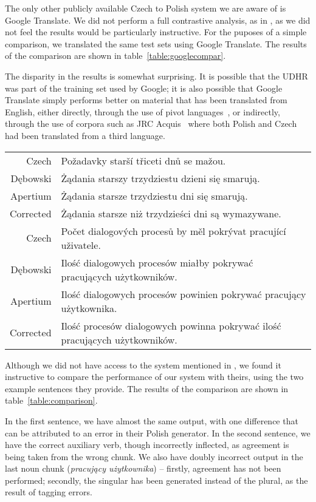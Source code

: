 \documentclass[11pt]{article}
\begin{document}
The only other publicly available Czech to Polish system we are aware of is Google Translate. We did not
perform a full contrastive analysis, as in \cite{tyers2009rfr}, as we did not
feel the results would be particularly instructive. For the puposes of a simple
comparison, we translated the same test sets using Google Translate. The results
of the comparison are shown in table~\ref{table:googlecompar}.

The disparity in the results is somewhat surprising. It is possible that the UDHR
was part of the training set used by Google; it is also possible that Google Translate
simply performs better on material that has been translated from English, either
directly, through the use of pivot languages~\citep{Kumar07}, or indirectly, through
the use of corpora such as JRC Acquis~\citep{Steinberger2006} where both Polish and
Czech had been translated from a third language. 

\begin{table*}
\centering
\begin{tabular}{|r|l|}
\hline
Czech & Požadavky starší třiceti dnů se mažou.\\
Dębowski & Żądania starszy trzydziestu dzieni się smarują.\\
Apertium & Żądania starsze trzydziestu dni się smarują.\\
Corrected & Żądania starsze niż trzydzieści dni są wymazywane.\\
\hline
Czech & Počet dialogových procesů by měl pokrývat pracující uživatele.\\
Dębowski & Ilość dialogowych procesów miałby pokrywać pracujących użytkowników.\\
Apertium & Ilość dialogowych procesów powinien pokrywać pracujący użytkownika. \\
Corrected & Ilość procesów dialogowych powinna pokrywać ilość pracujących użytkowników.\\
\hline
\end{tabular}
    \caption{A comparison of Dębowski and our system.}
    \label{table:comparison}
\end{table*}

Although we did not have access to the system mentioned in \cite{Debowski02}, we
found it instructive to compare the performance of our system with theirs, using
the two example sentences they provide. The results
of the comparison are shown in table~\ref{table:comparison}.

In the first sentence, we have almost the same output, with one difference
that can be attributed to an error in their Polish generator. In the second
sentence, we have the correct auxiliary verb, though incorrectly inflected, 
as agreement is being taken from the wrong chunk. We also have doubly
incorrect output in the last noun chunk (\emph{pracujący użytkownika}) -- firstly,
agreement has not been performed; secondly, the singular has been generated instead
of the plural, as the result of tagging errors.
\end{document}
